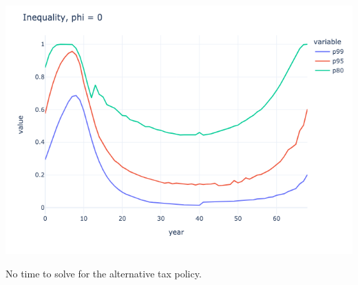 \begin{questions}
\begin{solution}
	\includegraphics[scale=0.5]{figures/inequality_0_tax_30.png}
\end{solution}

No time to solve for the alternative tax policy.

\end{questions}


